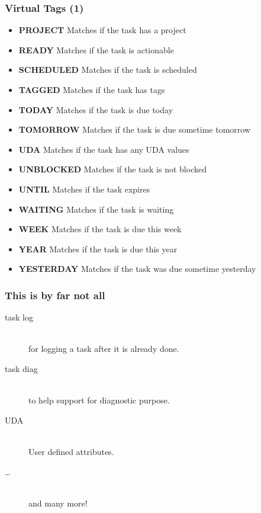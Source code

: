 \documentclass[t]{beamer}
\begin{document}
\begin{frame}[fragile]\frametitle{Virtual Tags (1)}
    \begin{itemize}
        \item \textbf{PROJECT}      Matches if the task has a project
        \item \textbf{READY}        Matches if the task is actionable
        \item \textbf{SCHEDULED}    Matches if the task is scheduled
        \item \textbf{TAGGED}       Matches if the task has tags
        \item \textbf{TODAY}        Matches if the task is due today
        \item \textbf{TOMORROW}     Matches if the task is due sometime tomorrow
        \item \textbf{UDA}          Matches if the task has any UDA values
        \item \textbf{UNBLOCKED}    Matches if the task is not blocked
        \item \textbf{UNTIL}        Matches if the task expires
        \item \textbf{WAITING}      Matches if the task is waiting
        \item \textbf{WEEK}         Matches if the task is due this week
        \item \textbf{YEAR}         Matches if the task is due this year
        \item \textbf{YESTERDAY}    Matches if the task was due sometime yesterday
    \end{itemize}
\end{frame}

\begin{frame}[fragile]\frametitle{This is by far not all}
    \begin{description}
        \item[task log] \hfill \\
            for logging a task after it is already done.
        \item[task diag] \hfill \\
            to help support for diagnostic purpose.
        \item[UDA] \hfill \\
            User defined attributes.
        \item[\ldots] \hfill \\
            and many more!
    \end{description}
\end{frame}
\end{document}
